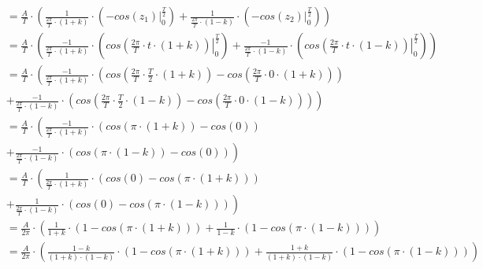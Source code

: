 \begin{task}
\begin{align*}
&=\frac{A}{T} \cdot \left(\frac{1}{\frac{2\pi}{T}\cdot \left(1+k\right)} \cdot \left( \left. -cos\left( z_1 \right) \right|_{0}^{\frac{T}{2}} \right) + \frac{1}{\frac{2\pi}{T} \cdot \left(1-k\right)} \cdot \left(\left. -cos\left( z_2\right) \right|_{0}^{\frac{T}{2}} \right) \right)\\
&=\frac{A}{T} \cdot \left(\frac{-1}{\frac{2\pi}{T}\cdot \left(1+k\right)} \cdot \left( \left. cos\left( \frac{2\pi}{T} \cdot t \cdot \left(1+k\right) \right) \right|_{0}^{\frac{T}{2}} \right) + \frac{-1}{\frac{2\pi}{T} \cdot \left(1-k\right)} \cdot \left(\left. cos\left( \frac{2\pi}{T} \cdot t \cdot \left(1-k\right)\right) \right|_{0}^{\frac{T}{2}} \right) \right)\\
&=\frac{A}{T} \cdot \left(\frac{-1}{\frac{2\pi}{T}\cdot \left(1+k\right)} \cdot \left( cos\left( \frac{2\pi}{T} \cdot \frac{T}{2} \cdot \left(1+k\right) \right) - cos\left( \frac{2\pi}{T} \cdot 0 \cdot \left(1+k\right) \right) \right) \right.\\
&\left.+ \frac{-1}{\frac{2\pi}{T} \cdot \left(1-k\right)} \cdot \left( cos\left( \frac{2\pi}{T} \cdot \frac{T}{2} \cdot \left(1-k\right)\right) -  cos\left( \frac{2\pi}{T} \cdot 0 \cdot \left(1-k\right)\right) \right) \right)\\
&=\frac{A}{T} \cdot \left(\frac{-1}{\frac{2\pi}{T}\cdot \left(1+k\right)} \cdot \left( cos\left(\pi \cdot \left(1+k\right) \right) - cos\left( 0 \right) \right) \right.\\
&\left.+ \frac{-1}{\frac{2\pi}{T} \cdot \left(1-k\right)} \cdot \left( cos\left(\pi \cdot \left(1-k\right)\right) -  cos\left( 0 \right) \right) \right)\\
&=\frac{A}{T} \cdot \left(\frac{1}{\frac{2\pi}{T}\cdot \left(1+k\right)} \cdot \left( cos\left( 0 \right) - cos\left(\pi \cdot \left(1+k\right) \right) \right) \right.\\
&\left.+ \frac{1}{\frac{2\pi}{T} \cdot \left(1-k\right)} \cdot \left( cos\left( 0 \right) - cos\left(\pi \cdot \left(1-k\right)\right) \right) \right)\\
&=\frac{A}{2\pi} \cdot \left(\frac{1}{1+k} \cdot \left( 1 - cos\left(\pi \cdot \left(1+k\right) \right) \right)+ \frac{1}{1-k} \cdot \left( 1 - cos\left(\pi \cdot \left(1-k\right)\right) \right) \right)\\
&=\frac{A}{2\pi} \cdot \left(\frac{1-k}{\left(1+k\right)\cdot\left(1-k\right)} \cdot \left( 1 - cos\left(\pi \cdot \left(1+k\right) \right) \right)+ \frac{1+k}{\left(1+k\right)\cdot\left(1-k\right)} \cdot \left( 1 - cos\left(\pi \cdot \left(1-k\right)\right) \right) \right)\\

\end{align*}
\end{task}

